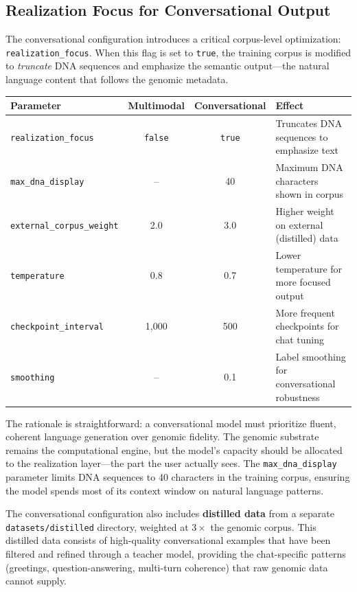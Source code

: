 \subsection{Realization Focus for Conversational Output}
\label{sec:realization-focus}

The conversational configuration introduces a critical corpus-level optimization: \texttt{realization\_focus}. When this flag is set to \texttt{true}, the training corpus is modified to \emph{truncate} DNA sequences and emphasize the semantic output---the natural language content that follows the genomic metadata.

\begin{center}
\renewcommand{\arraystretch}{1.15}
\begin{tabularx}{0.92\textwidth}{l c c Y}
\toprule
\textbf{Parameter} & \textbf{Multimodal} & \textbf{Conversational} & \textbf{Effect} \\
\midrule
\texttt{realization\_focus} & \texttt{false} & \texttt{true} & Truncates DNA sequences to emphasize text \\
\texttt{max\_dna\_display} & -- & 40 & Maximum DNA characters shown in corpus \\
\texttt{external\_corpus\_weight} & 2.0 & 3.0 & Higher weight on external (distilled) data \\
\texttt{temperature} & 0.8 & 0.7 & Lower temperature for more focused output \\
\texttt{checkpoint\_interval} & 1,000 & 500 & More frequent checkpoints for chat tuning \\
\texttt{smoothing} & -- & 0.1 & Label smoothing for conversational robustness \\
\bottomrule
\end{tabularx}
\end{center}

The rationale is straightforward: a conversational model must prioritize fluent, coherent language generation over genomic fidelity. The genomic substrate remains the computational engine, but the model's capacity should be allocated to the realization layer---the part the user actually sees. The \texttt{max\_dna\_display} parameter limits DNA sequences to 40 characters in the training corpus, ensuring the model spends most of its context window on natural language patterns.

The conversational configuration also includes \textbf{distilled data} from a separate \texttt{datasets/distilled} directory, weighted at $3\times$ the genomic corpus. This distilled data consists of high-quality conversational examples that have been filtered and refined through a teacher model, providing the chat-specific patterns (greetings, question-answering, multi-turn coherence) that raw genomic data cannot supply.

